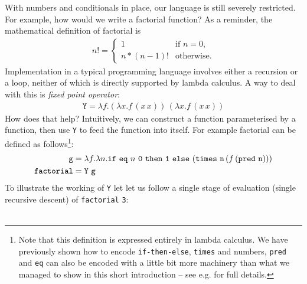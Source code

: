 \documentclass[11pt,twoside,a4paper]{article} %
\newcommand{\mkw}[1]{{\bf \mathtt{#1}}}
\newcommand{\sym}[1]{\texttt{#1}}
\newcommand{\msym}[1]{\mathtt{#1}}
\begin{document}
With numbers and conditionals in place, our language is still severely
restricted. For example, how would we write a factorial function? As a
reminder, the mathematical definition of factorial is
\begin{align*}
n!=\begin{cases}
    1 & \text{if $n=0$},\\
    n*(n-1)! & \text{otherwise}.
  \end{cases}
\end{align*}
Implementation in a typical programming language involves either a recursion or
a loop, neither of which is directly supported by lambda calculus. A way to
deal with this is \emph{fixed point operator}:
\begin{align*}
\msym{Y}=\lambda f.(\lambda x.f\,(x\,x))\,(\lambda x.f\,(x\,x))
\end{align*}
How does that help? Intuitively, we can construct a function parameterised by a 
function, then use \sym{Y} to feed the function into itself. For example factorial
can be defined as follows\footnote{Note that this definition is expressed 
entirely in lambda calculus. We have
previously shown how to encode \sym{if-then-else}, \sym{times} and numbers,
\sym{pred} and \sym{eq} can also be encoded with a little bit more machinery
than what we managed to show in this short introduction -- see e.g. \cite{TAPL} for 
full details.}:
\begin{align*}
\msym{g} &= \lambda f.\lambda
n.\mkw{if}\ \msym{eq}\ n\ \msym{0}\ \mkw{then}\ \msym{1}\ \mkw{else}\ (\msym{times}\ \msym{n}\,(f\,(\msym{pred}\ \msym{n}))) \\
\msym{factorial} &= \msym{Y}\ \msym{g}
\end{align*}
To illustrate the working of \sym{Y} let let us follow a single stage of evaluation
(single recursive descent) of \sym{factorial} \sym{3}:
\\\\
\end{document}
